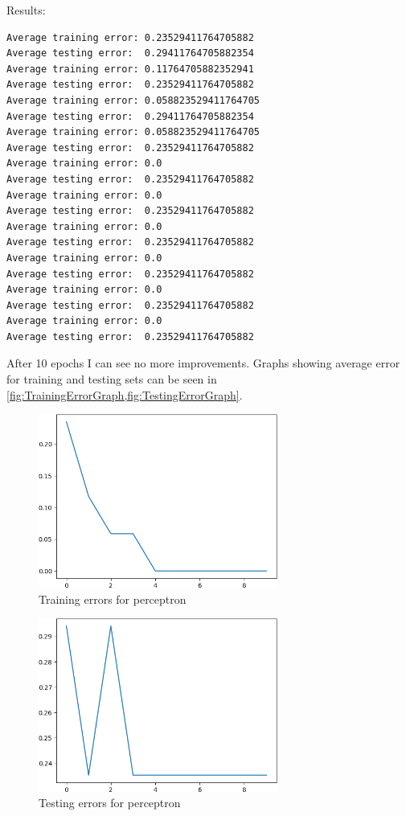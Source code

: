 \documentclass[a4,12pt]{extarticle}
\begin{document}
Results:
\begin{verbatim}
Average training error: 0.23529411764705882
Average testing error:  0.29411764705882354
Average training error: 0.11764705882352941
Average testing error:  0.23529411764705882
Average training error: 0.058823529411764705
Average testing error:  0.29411764705882354
Average training error: 0.058823529411764705
Average testing error:  0.23529411764705882
Average training error: 0.0
Average testing error:  0.23529411764705882
Average training error: 0.0
Average testing error:  0.23529411764705882
Average training error: 0.0
Average testing error:  0.23529411764705882
Average training error: 0.0
Average testing error:  0.23529411764705882
Average training error: 0.0
Average testing error:  0.23529411764705882
Average training error: 0.0
Average testing error:  0.23529411764705882
\end{verbatim}
After 10 epochs I can see no more improvements. Graphs showing average error for training and testing sets can be seen in \cref{fig:TrainingErrorGraph,fig:TestingErrorGraph}.
\begin{figure}[H]
  \centering
  \includegraphics[width=0.7\textwidth]{TrainingErrorGraph}
  \caption{Training errors for perceptron}
  \label{fig:TrainingErrorGraph}
\end{figure}
\begin{figure}[H]
  \centering
  \includegraphics[width=0.7\textwidth]{TestingErrorGraph}
  \caption{Testing errors for perceptron}
  \label{fig:TestingErrorGraph}
\end{figure}
\end{document}
